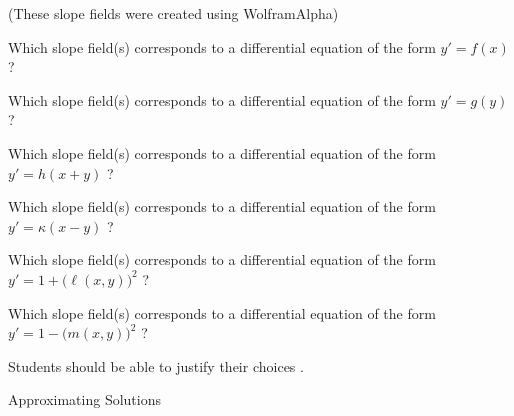 \hfill {\footnotesize(These slope fields were created using WolframAlpha)} \\


\begin{parts}
	\item Which slope field(s) corresponds to a differential equation of the form
		\qquad $y'=f(x)$ \qquad ?	

	\item Which slope field(s) corresponds to a differential equation of the form
		\qquad $y'=g(y)$ \qquad ?	

	\item Which slope field(s) corresponds to a differential equation of the form
		\qquad $y'=h(x+y)$ \qquad ?	

	\item Which slope field(s) corresponds to a differential equation of the form
		\qquad $y'=\kappa(x-y)$ \qquad ?	

	\item Which slope field(s) corresponds to a differential equation of the form
		\qquad $y'=1+\big( \ell(x,y) \big)^2$ \qquad ?	

	\item Which slope field(s) corresponds to a differential equation of the form
		\qquad $y'=1-\big( m(x,y) \big)^2$ \qquad ?	

\end{parts}

\begin{annotation}
	\begin{goals}
		Students should be able to justify their choices	.
	\end{goals}
\end{annotation}






\standardonlynewpage





%
%



\begin{module}{Approximating Solutions}
	\label{ODE:approximation}

	
	
\end{module}



